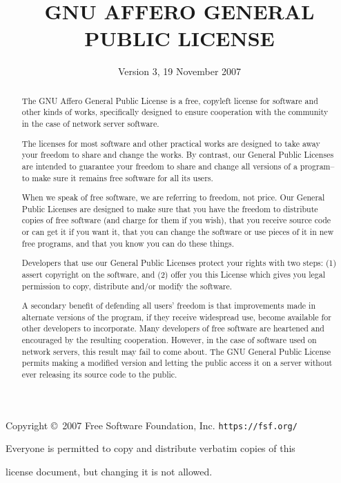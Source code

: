\documentclass[11pt]{article}
\title{GNU AFFERO GENERAL PUBLIC LICENSE}
\date{Version 3, 19 November 2007}
\begin{document}
\maketitle

\begin{center}
{\parindent 0in

Copyright \copyright\  2007 Free Software Foundation, Inc. \texttt{https://fsf.org/}

\bigskip
Everyone is permitted to copy and distribute verbatim copies of this

license document, but changing it is not allowed.}

\end{center}

\renewcommand{\abstractname}{Preamble}
\begin{abstract}
The GNU Affero General Public License is a free, copyleft license
for software and other kinds of works, specifically designed to ensure
cooperation with the community in the case of network server software.

The licenses for most software and other practical works are
designed to take away your freedom to share and change the works.  By
contrast, our General Public Licenses are intended to guarantee your
freedom to share and change all versions of a program--to make sure it
remains free software for all its users.

When we speak of free software, we are referring to freedom, not
price.  Our General Public Licenses are designed to make sure that you
have the freedom to distribute copies of free software (and charge for
them if you wish), that you receive source code or can get it if you
want it, that you can change the software or use pieces of it in new
free programs, and that you know you can do these things.

Developers that use our General Public Licenses protect your rights
with two steps: (1) assert copyright on the software, and (2) offer
you this License which gives you legal permission to copy, distribute
and/or modify the software.

A secondary benefit of defending all users' freedom is that
improvements made in alternate versions of the program, if they
receive widespread use, become available for other developers to
incorporate.  Many developers of free software are heartened and
encouraged by the resulting cooperation.  However, in the case of
software used on network servers, this result may fail to come about.
The GNU General Public License permits making a modified version and
letting the public access it on a server without ever releasing its
source code to the public.


\end{abstract}
\end{document}
